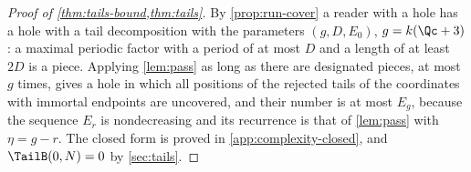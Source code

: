 \begin{proof}[Proof of \cref{thm:tails-bound,thm:tails}]
By \cref{prop:run-cover} a reader with a hole has a hole with a tail
decomposition with the parameters $(g,D,E_0)$, $g=k(\Qc+3)$: a maximal
periodic factor with a period of at most $D$ and a length of at least $2D$
is a piece. Applying \cref{lem:pass} as long as there are designated pieces,
at most $g$ times, gives a hole in which
all positions of the rejected tails of the coordinates with immortal
endpoints are uncovered, and their number is at most $E_g$, because the
sequence $E_r$ is nondecreasing and its recurrence is that of
\cref{lem:pass} with $\eta=g-r$. The closed form is proved in
\cref{app:complexity-closed}, and $\TailB(0,N)=0$ by \cref{sec:tails}.
\end{proof}
